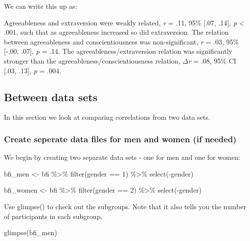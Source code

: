 \documentclass[
]{krantz}
\makeatletter
\newenvironment{Shaded}{\begin{snugshade}}{\end{snugshade}}
\newcommand{\DecValTok}[1]{\textcolor[rgb]{0.06,0.06,0.06}{#1}}
\newcommand{\FunctionTok}[1]{\textcolor[rgb]{0,0,0}{#1}}
\newcommand{\NormalTok}[1]{#1}
\newcommand{\OtherTok}[1]{\textcolor[rgb]{0.37,0.37,0.37}{#1}}
\newcommand{\SpecialCharTok}[1]{\textcolor[rgb]{0,0,0}{#1}}
\newenvironment{kframe}{%
\medskip{}
\setlength{\fboxsep}{.8em}
 \def\at@end@of@kframe{}%
 \ifinner\ifhmode%
  \def\at@end@of@kframe{\end{minipage}}%
  \begin{minipage}{\columnwidth}%
 \fi\fi%
 \def\FrameCommand##1{\hskip\@totalleftmargin \hskip-\fboxsep
 \colorbox{shadecolor}{##1}\hskip-\fboxsep
     \hskip-\linewidth \hskip-\@totalleftmargin \hskip\columnwidth}%
 \MakeFramed {\advance\hsize-\width
   \@totalleftmargin\z@ \linewidth\hsize
   \@setminipage}}%
 {\par\unskip\endMakeFramed%
 \at@end@of@kframe}
\renewenvironment{Shaded}{\begin{kframe}}{\end{kframe}}
\makeatother
\begin{document}
We can write this up as:

Agreeableness and extraversion were weakly related, \emph{r} = .11, 95\% {[}.07, .14{]}, \emph{p} \textless{} .001, such that as agreeableness increased so did extraversion. The relation between agreeableness and conscientiousness was non-significant, \emph{r} = .03, 95\% {[}-.00, .07{]}, \emph{p} = .14. The agreeableness/extraversion relation was significantly stronger than the agreeableness/conscientiousness relation, \(\Delta\)\emph{r} = .08, 95\% CI {[}.03, .13{]}, \emph{p} = .004.

\hypertarget{between-data-sets}{%
\subsection{Between data sets}\label{between-data-sets}}

In this section we look at comparing correlations from two data sets.

\hypertarget{create-seperate-data-files-for-men-and-women-if-needed}{%
\subsubsection{Create seperate data files for men and women (if needed)}\label{create-seperate-data-files-for-men-and-women-if-needed}}

We begin by creating two separate data sets - one for men and one for women:

\begin{Shaded}
\begin{Highlighting}[]
\NormalTok{bfi\_men   }\OtherTok{\textless{}{-}}\NormalTok{ bfi }\SpecialCharTok{\%\textgreater{}\%}
  \FunctionTok{filter}\NormalTok{(gender }\SpecialCharTok{==} \DecValTok{1}\NormalTok{) }\SpecialCharTok{\%\textgreater{}\%}
  \FunctionTok{select}\NormalTok{(}\SpecialCharTok{{-}}\NormalTok{gender)}

\NormalTok{bfi\_women }\OtherTok{\textless{}{-}}\NormalTok{ bfi }\SpecialCharTok{\%\textgreater{}\%}
  \FunctionTok{filter}\NormalTok{(gender }\SpecialCharTok{==} \DecValTok{2}\NormalTok{) }\SpecialCharTok{\%\textgreater{}\%}
  \FunctionTok{select}\NormalTok{(}\SpecialCharTok{{-}}\NormalTok{gender)}
\end{Highlighting}
\end{Shaded}

Use glimpse() to check out the subgroups. Note that it also tells you the number of participants in each subgroup.

\begin{Shaded}
\begin{Highlighting}[]
\FunctionTok{glimpse}\NormalTok{(bfi\_men)}
\end{Highlighting}
\end{Shaded}
\end{document}
